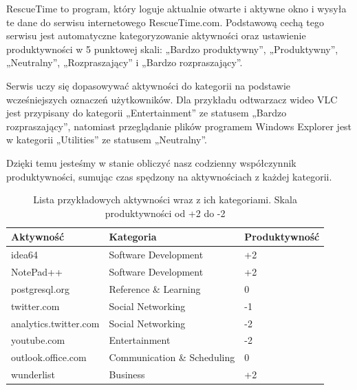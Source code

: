 \documentclass[openright]{xmgr}
\begin{document}
            RescueTime to program, który loguje aktualnie otwarte i aktywne okno
            i wysyła te dane do serwisu internetowego RescueTime.com.
            Podstawową cechą tego serwisu jest automatyczne kategoryzowanie aktywności oraz ustawienie produktywności w 5 punktowej skali:
            „Bardzo produktywny”, „Produktywny”, „Neutralny”, „Rozpraszający” i „Bardzo rozpraszający”.

            Serwis uczy się dopasowywać aktywności do kategorii na podstawie wcześniejszych oznaczeń użytkowników.
            Dla przykładu odtwarzacz wideo VLC jest przypisany do kategorii „Entertainment” ze statusem „Bardzo rozpraszający”,
            natomiast przeglądanie plików programem Windows Explorer jest w kategorii „Utilities” ze statusem „Neutralny”.

            Dzięki temu jesteśmy w stanie obliczyć nasz codzienny współczynnik produktywności,
            sumując czas spędzony na aktywnościach z każdej kategorii.

            \begin{table}[]
            \centering
            \begin{tabular}{lll}
                \hline
                \multicolumn{1}{l|}{Aktywność} & \multicolumn{1}{l|}{Kategoria} & Produktywność \\ \hline
                idea64                         & Software Development           & +2            \\
                NotePad++                      & Software Development           & +2            \\
                postgresql.org                 & Reference \& Learning          & 0             \\
                twitter.com                    & Social Networking              & -1            \\
                analytics.twitter.com          & Social Networking              & -2            \\
                youtube.com                    & Entertainment                  & -2            \\
                outlook.office.com             & Communication \& Scheduling    & 0             \\
                wunderlist                     & Business                       & +2
                \end{tabular}
                \caption{
                    Lista przykładowych aktywności wraz z ich kategoriami. Skala produktywności od +2 do -2
                }
                \label{RescueTime --- lista przykładowych aktywności}
            \end{table}
\end{document}
